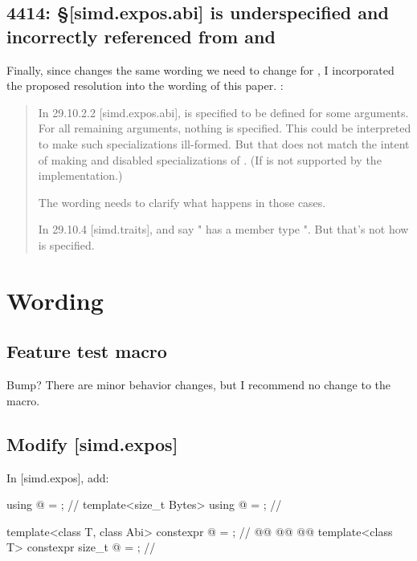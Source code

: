 \subsection{4414: §[simd.expos.abi]  is underspecified and incorrectly
referenced from  and }

Finally, since  changes the same wording we need to change for , I incorporated
the proposed resolution into the wording of this paper.
:
\begin{quote}
  In 29.10.2.2 [simd.expos.abi],  is specified to be defined for some arguments.
  For all remaining arguments, nothing is specified.
  This could be interpreted to make such specializations ill-formed.
  But that does not match the intent of making  and
   disabled specializations of .
  (If  is not supported by the implementation.)

  The wording needs to clarify what happens in those cases.

  In 29.10.4 [simd.traits],  and  say " has a member type ".
  But that's not how  is specified.
\end{quote}

\section{Wording}

\subsection{Feature test macro}

Bump? There are minor behavior changes, but I recommend no change to the macro.

\subsection{Modify [simd.expos]}
In [simd.expos], add:

\begin{wgText}
\begin{codeblock}
using @ = \seebelownc@;                                    // \expos
template<size_t Bytes> using @ = \seebelownc@;               // \expos

template<class T, class Abi>
  constexpr @  = \seebelownc@;                  // \expos
@@
  @@                  @\wgAdd{\rmfamily\itshape// \expos}@
template<class T> constexpr size_t @ = \seebelownc@;    // \expos
\end{codeblock}
\end{wgText}


